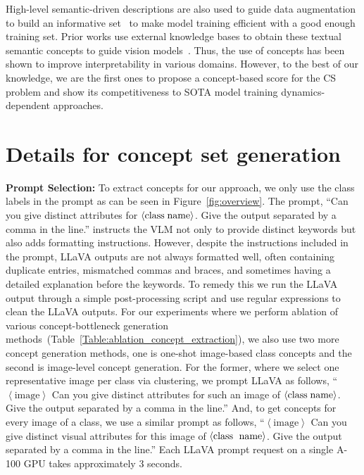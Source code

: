 High-level semantic-driven descriptions are also used to guide data augmentation to build an informative set~\cite{wickramanayake2021explanation} to make model training efficient with a good enough training set. 
Prior works use external knowledge bases to obtain these textual semantic concepts to guide vision models~\cite{bujwid2021large,kil2021revisiting,roth2022integrating,shen2022k}. 
Thus, the use of concepts has been shown to improve interpretability in various domains. However, to the best of our knowledge, we are the first ones to propose a concept-based score for the CS problem and show its competitiveness to SOTA model training dynamics-dependent approaches.



\section{Details for concept set generation}
\label{app:concept_extraction}
\noindent\textbf{Prompt Selection: }To extract concepts for our approach, we only use the class labels in the prompt as can be seen in Figure~\ref{fig:overview}. 
The prompt, ``Can you give distinct attributes for $ \left< \text{class\;name}\right>$. Give the output separated by a comma in the line.'' instructs the VLM not only to provide distinct keywords but also adds formatting instructions. 
However, despite the instructions included in the prompt, LLaVA outputs are not always formatted well, often containing duplicate entries, mismatched commas and braces, and sometimes having a detailed explanation before the keywords. 
To remedy this we run the LLaVA output through a simple post-processing script and use regular expressions to clean the LLaVA outputs. 
For our experiments where we perform ablation of various concept-bottleneck generation methods~(Table~\ref{Table:ablation_concept_extraction}), we also use two more concept generation methods, one is one-shot image-based class concepts and the second is image-level concept generation. 
For the former, where we select one representative image per class via clustering, we prompt LLaVA as follows, ``$ \left< \text{image}\right>$ Can you give distinct attributes for such an image of $ \left< \text{class\;name}\right>$. Give the output separated by a comma in the line.''
And, to get concepts for every image of a class, we use a similar prompt as follows, ``$ \left< \text{image}\right>$ Can you give distinct visual attributes for this image of $ \left< \text{class\; name}\right>$. Give the output separated by a comma in the line.'' Each LLaVA prompt request on a single A-100 GPU takes approximately 3 seconds. 

